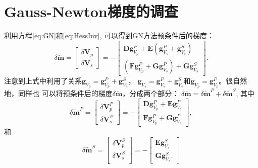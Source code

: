 \chapter{Gauss-Newton梯度的调查}
\label{cha:InvestigationOfGNGradient}
利用方程\eqref{eq:GN}和\eqref{eq:HessInv}, 可以得到GN方法预条件后的梯度：
\begin{equation}
        \delta \tilde{\mathbf{m}}=
        \begin{bmatrix}
                \delta \mathbf{V}_p\\
                \delta\mathbf{V}_s
        \end{bmatrix}
        =-
        \begin{bmatrix}
                \mathbf{D}\mathbf{g}^P_{V_p} +
                \mathbf{E}(\mathbf{g}^P_{V_s}+\mathbf{g}^S_{V_s})\\
                (\mathbf{F}\mathbf{g}^P_{V_p}+\mathbf{G}\mathbf{g}^P_{V_s}) +
                \mathbf{G}\mathbf{g}^S_{V_s}
        \end{bmatrix}.
        \label{eq:PreGN}
\end{equation}
注意到上式中利用了关系$\mathbf{g}_{V_p}=\mathbf{g}^P_{V_p}+\mathbf{g}^S_{V_p}$，
$\mathbf{g}_{V_s}=\mathbf{g}^P_{V_s}+\mathbf{g}^S_{V_s}$和$\mathbf{g}_{V_p}=\mathbf{g}^P_{V_p}$。很自然地，同样也
可以将预条件后的梯度$\delta\tilde{\mathbf{m}}$，分成两个部分：
$\delta \tilde{\mathbf{m}} = \delta \tilde{\mathbf{m}}^P+\delta
\tilde{\mathbf{m}}^S$, 其中
\begin{equation}
        \delta \tilde{\mathbf{m}}^P=
        \begin{bmatrix}
                \delta \mathbf{V}^P_p\\
                \delta \mathbf{V}^P_s
        \end{bmatrix}
        =-
        \begin{bmatrix}
                \mathbf{D}\mathbf{g}^P_{V_p} +
                \mathbf{E}\mathbf{g}^P_{V_s}\\
                \mathbf{F}\mathbf{g}^P_{V_p}+\mathbf{G}\mathbf{g}^P_{V_s}
        \end{bmatrix},
        \label{eq:PreGNP}
\end{equation}
和
\begin{equation}
        \delta \tilde{\mathbf{m}}^S=
        \begin{bmatrix}
                \delta \mathbf{V}^S_p\\
                \delta \mathbf{V}^S_s\\
        \end{bmatrix}
        =-
        \begin{bmatrix}
                \mathbf{E}\mathbf{g}^S_{V_s}\\
                \mathbf{G}\mathbf{g}^S_{V_s}.
        \end{bmatrix}
        \label{eq:PreGNS}
\end{equation}

